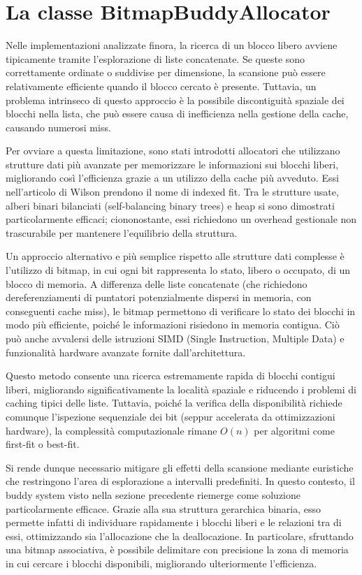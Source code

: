 \section{La classe BitmapBuddyAllocator}
Nelle implementazioni analizzate finora, la ricerca di un blocco libero avviene tipicamente tramite l'esplorazione di liste concatenate. Se queste sono correttamente ordinate o suddivise per dimensione, la scansione può essere relativamente efficiente quando il blocco cercato è presente. Tuttavia, un problema intrinseco di questo approccio è la possibile discontiguità spaziale dei blocchi nella lista, che può essere causa di inefficienza nella gestione della cache, causando numerosi miss.

Per ovviare a questa limitazione, sono stati introdotti allocatori che utilizzano strutture dati più avanzate per memorizzare le informazioni sui blocchi liberi, migliorando così l’efficienza grazie a un utilizzo della cache più avveduto. Essi nell’articolo di Wilson prendono il nome di indexed fit. Tra le strutture usate, alberi binari bilanciati (self-balancing binary trees) e heap si sono dimostrati particolarmente efficaci; ciononostante, essi richiedono un overhead gestionale non trascurabile per mantenere l’equilibrio della struttura.

Un approccio alternativo e più semplice rispetto alle strutture dati complesse è l’utilizzo di bitmap, in cui ogni bit rappresenta lo stato, libero o occupato, di un blocco di memoria. A differenza delle liste concatenate (che richiedono dereferenziamenti di puntatori potenzialmente dispersi in memoria, con conseguenti cache miss), le bitmap permettono di verificare lo stato dei blocchi in modo più efficiente, poiché le informazioni risiedono in memoria contigua. Ciò può anche avvalersi delle istruzioni SIMD (Single Instruction, Multiple Data) e funzionalità hardware avanzate fornite dall’architettura.

Questo metodo consente una ricerca estremamente rapida di blocchi contigui liberi, migliorando significativamente la località spaziale e riducendo i problemi di caching tipici delle liste. Tuttavia, poiché la verifica della disponibilità richiede comunque l’ispezione sequenziale dei bit (seppur accelerata da ottimizzazioni hardware), la complessità computazionale rimane $O(n)$ per algoritmi come first-fit o best-fit.

Si rende dunque necessario mitigare gli effetti della scansione mediante euristiche che restringono l’area di esplorazione a intervalli predefiniti. In questo contesto, il buddy system visto nella sezione precedente riemerge come soluzione particolarmente efficace. Grazie alla sua struttura gerarchica binaria, esso permette infatti di individuare rapidamente i blocchi liberi e le relazioni tra di essi, ottimizzando sia l’allocazione che la deallocazione. In particolare, sfruttando una bitmap associativa, è possibile delimitare con precisione la zona di memoria in cui cercare i blocchi disponibili, migliorando ulteriormente l’efficienza.

